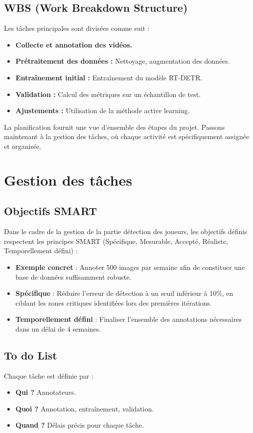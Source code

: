 \subsection{WBS (Work Breakdown Structure)}
Les tâches principales sont divisées comme suit :
\begin{itemize}
    \item \textbf{Collecte et annotation des vidéos.}
    \item \textbf{Prétraitement des données :} Nettoyage, augmentation des données.
    \item \textbf{Entraînement initial :} Entraînement du modèle RT-DETR.
    \item \textbf{Validation :} Calcul des métriques sur un échantillon de test.
    \item \textbf{Ajustements :} Utilisation de la méthode active learning.
\end{itemize}
La planification fournit une vue d'ensemble des étapes du projet. Passons maintenant à la gestion des tâches, où chaque activité est spécifiquement assignée et organisée.

\section{Gestion des tâches}
\subsection{Objectifs SMART}  
Dans le cadre de la gestion de la partie détection des joueurs, les objectifs définis respectent les principes SMART (Spécifique, Mesurable, Accepté, Réaliste, Temporellement défini) :  
\begin{itemize}  
    \item \textbf{Exemple concret} : Annoter 500 images par semaine afin de constituer une base de données suffisamment robuste.  
    \item \textbf{Spécifique} : Réduire l’erreur de détection à un seuil inférieur à 10\%, en ciblant les zones critiques identifiées lors des premières itérations.  
    \item \textbf{Temporellement défini} : Finaliser l’ensemble des annotations nécessaires dans un délai de 4 semaines.  
\end{itemize}


\subsection{To do List}
Chaque tâche est définie par :
\begin{itemize}
    \item \textbf{Qui ?} Annotateurs.
    \item \textbf{Quoi ?} Annotation, entraînement, validation.
    \item \textbf{Quand ?} Délais précis pour chaque tâche.
\end{itemize}

